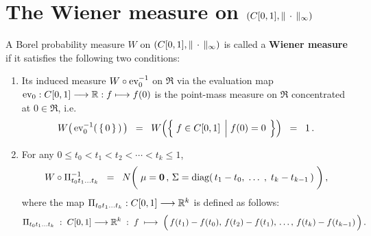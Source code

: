 

\section{The Wiener measure on $\left(C[0,1],\Vert\,\cdot\,\Vert_{\infty}\right)$}
\setcounter{theorem}{0}
\setcounter{equation}{0}

\newcommand{\Pitzk}{\Pi_{t_{0}t_{1}\ldots t_{k}}}
\newcommand{\pitok}{\pi_{t_{1}\ldots t_{k}}}

\renewcommand{\theenumi}{\roman{enumi}}
\renewcommand{\labelenumi}{\textnormal{(\theenumi)}$\;\;$}

\begin{definition}
\mbox{}\vskip 0.2cm
\noindent
A Borel probability measure $W$ on $\left(C[0,1],\Vert\,\cdot\,\Vert_{\infty}\right)$ is called a
\textbf{Wiener measure} if it satisfies the following two conditions:
\begin{enumerate}
\item	Its induced measure $W\circ\textnormal{ev}_{0}^{-1}$ on $\Re$
		via the evaluation map $\textnormal{ev}_{0} : C[0,1] \longrightarrow \mathbb{R} : f \longmapsto f(0)$
		is the point-mass measure on $\Re$ concentrated at $0 \in \Re$, i.e.
		\begin{equation*}
		W\!\left(\,\ev_{0}^{-1}\!\left(\,\left\{\,0\,\right\}\,\right)\,\right)
		\;\; = \;\;
		W\!\left(\left\{\;
			f \in \Czo
			\;\left\vert\;
			f(0) \overset{{\color{white}1}}{=} 0
			\right.
		\;\right\}\right)
		\;\; = \;\;
		1\,.
		\end{equation*}
\item	For any $0 \leq t_{0} < t_{1} < t_{2} < \cdots < t_{k} \leq 1$,
		\begin{equation*}
		W \circ \Pitzk^{-1}
		\;\; = \;\;
		N\!\left(\;
		\mathbf{\mu} = \mathbf{0}\,,\,
		\overset{{\color{white}1}}{\Sigma} = \diag\!\left(\,t_{1}-t_{0},\; \ldots\; ,\; t_{k}-t_{k-1}\,\right)
		\;\right),
		\end{equation*}
		where the map \;$\Pitzk : \Czo \longrightarrow \Re^{k}$\; is defined as follows:
		\begin{equation*}
		\Pitzk \;:\; \Czo \longrightarrow \Re^{k} \;:\;
		f \;\longmapsto\; \left(\,\overset{{\color{white}.}}{f}(t_{1}) - f(t_{0}),\,f(t_{2}) - f(t_{1}),\,\ldots,\,f(t_{k}) - f(t_{k-1})\,\right).
		\end{equation*}
\end{enumerate}
\end{definition}

